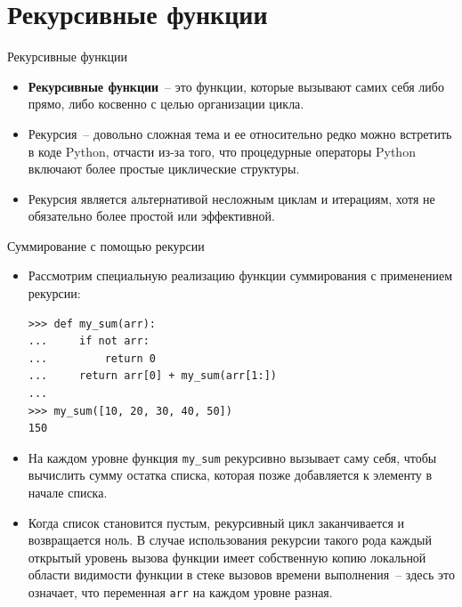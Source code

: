 \documentclass[aspectratio=169]{beamer}%
\begin{document}
\section{Рекурсивные функции}
\sectionframe

\begin{frame}[fragile]{Рекурсивные функции}
\footnotesize
\begin{itemize}
\item \textcolor{extraorange}{\textbf{Рекурсивные функции}}~-- это функции, которые вызывают самих себя либо прямо, либо косвенно с целью организации цикла.
\item Рекурсия~-- довольно сложная тема и ее относительно редко можно встретить в коде Python, отчасти из-за того, что процедурные операторы Python включают более простые циклические структуры. 
\item  Рекурсия  является альтернативой несложным циклам и итерациям, хотя не обязательно более простой или эффективной.
\end{itemize}
\vfill
\end{frame}


\begin{frame}[fragile]{Суммирование с помощью рекурсии}
\scriptsize
\begin{itemize}
\item Рассмотрим специальную реализацию функции суммирования с применением рекурсии:

\begin{verbatim}
>>> def my_sum(arr):
...     if not arr:
...         return 0
...     return arr[0] + my_sum(arr[1:])
...
>>> my_sum([10, 20, 30, 40, 50])
150
\end{verbatim}

\item На каждом уровне функция \texttt{my\_sum} рекурсивно вызывает саму себя, чтобы вычислить сумму остатка списка, которая позже добавляется к элементу в начале списка. 
\item Когда список становится пустым, рекурсивный цикл заканчивается и возвращается ноль. 
\texttt{}В случае использования рекурсии такого рода каждый открытый уровень вызова функции имеет собственную копию локальной области видимости функции в стеке вызовов времени выполнения~-- здесь это означает, что переменная \texttt{arr} на каждом уровне разная.
\end{itemize}
\vfill
\end{frame}
\end{document}
